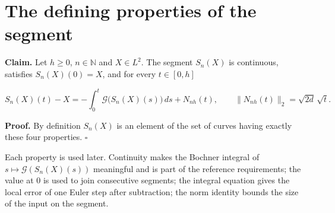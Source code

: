 \documentclass[11pt,a4paper]{article}
\begin{document}
\section{\texorpdfstring{The defining properties of the segment}{The defining properties of the segment}}


\textbf{Claim.} Let \(h\ge0\), \(n\in\mathbb N\) and \(X\in L^2\). The segment \(S_n(X)\) is continuous, satisfies \(S_n(X)(0)=X\), and for every \(t\in[0,h]\)


\[S_n(X)(t)-X=-\int_0^t\mathcal G\bigl(S_n(X)(s)\bigr)\,ds+N_{nh}(t),\qquad \|N_{nh}(t)\|_2=\sqrt{2d}\,\sqrt t.\]


\textbf{Proof.} By definition \(S_n(X)\) is an element of the set of curves having exactly these four properties. \(\square\)




Each property is used later. Continuity makes the Bochner integral of \(s\mapsto\mathcal G(S_n(X)(s))\) meaningful and is part of the reference requirements; the value at \(0\) is used to join consecutive segments; the integral equation gives the local error of one Euler step after subtraction; the norm identity bounds the size of the input on the segment.
\end{document}
